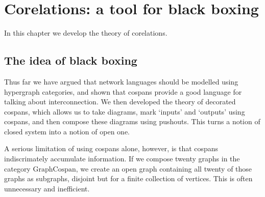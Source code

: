 \chapter{Corelations: a tool for black boxing} \label{ch.corelations}

In this chapter we develop the theory of corelations.

\section{The idea of black boxing}

Thus far we have argued that network languages should be modelled using
hypergraph categories, and shown that cospans provide a good language for
talking about interconnection. We then developed the theory of decorated
cospans, which allows us to take diagrams, mark `inputs' and `outputs' using
cospans, and then compose these diagrams using pushouts. This turns a notion of
closed system into a notion of open one.

A serious limitation of using cospans alone, however, is that cospans
indiscrimately accumulate information. If we compose twenty graphs in the
category $\mathrm{GraphCospan}$, we create an open graph containing all twenty
of those graphs as subgraphs, disjoint but for a finite collection of vertices.
This is often unnecessary and inefficient.

